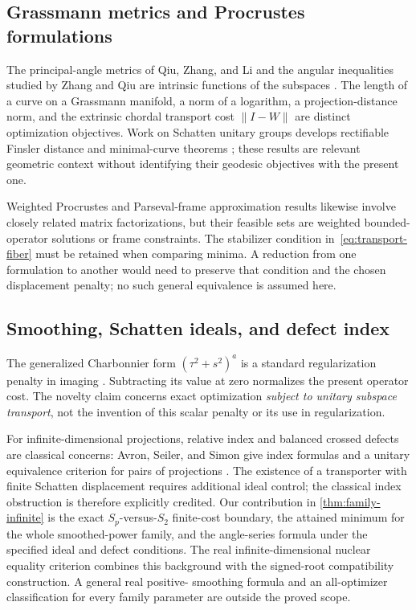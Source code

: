 \documentclass[11pt]{article}
\begin{document}
\subsection{Grassmann metrics and Procrustes formulations}
\label{sec:related-objectives}

The principal-angle metrics of Qiu, Zhang, and Li and the angular
inequalities studied by Zhang and Qiu are intrinsic functions of the
subspaces \citep{qiu2006grassmann,zhang2007angular,zhang2010canonicalangles}.
The length of a curve on a Grassmann manifold, a norm of a logarithm,
a projection-distance norm, and the extrinsic chordal transport cost
$\|I-W\|$ are distinct optimization objectives.  Work on Schatten
unitary groups develops rectifiable Finsler distance and minimal-curve
theorems \citep{andruchow2010finsler,larotonda2026shortcurves}; these
results are relevant geometric context without identifying their
geodesic objectives with the present one.

Weighted Procrustes and Parseval-frame approximation results
\citep{contino2017weighted,corach2014procrustes} likewise involve
closely related matrix factorizations, but their feasible sets are
weighted bounded-operator solutions or frame constraints.  The
stabilizer condition in~\eqref{eq:transport-fiber} must be retained
when comparing minima.  A reduction from one formulation to another
would need to preserve that condition and the chosen displacement
penalty; no such general equivalence is assumed here.

\subsection{Smoothing, Schatten ideals, and defect index}
\label{sec:related-ideals}

The generalized Charbonnier form $(\tau^2+s^2)^a$ is a standard
regularization penalty in imaging
\citep{sun2010secrets,lobos2026smooth}.  Subtracting its value at zero
normalizes the present operator cost.  The novelty claim concerns exact
optimization \emph{subject to unitary subspace transport}, not the
invention of this scalar penalty or its use in regularization.

For infinite-dimensional projections, relative index and balanced
crossed defects are classical concerns: Avron, Seiler, and Simon give
index formulas and a unitary equivalence criterion for pairs of
projections \citep{avron1994index}.  The existence of a transporter
with finite Schatten displacement requires additional ideal control;
the classical index obstruction is therefore explicitly credited.
Our contribution in \cref{thm:family-infinite} is the exact
$S_p$-versus-$S_2$ finite-cost boundary, the attained minimum for the
whole smoothed-power family, and the angle-series formula under the
specified ideal and defect conditions.  The real infinite-dimensional
nuclear equality criterion combines this background with the
signed-root compatibility construction.  A general real positive-
smoothing formula and an all-optimizer classification for every family
parameter are outside the proved scope.
\end{document}
